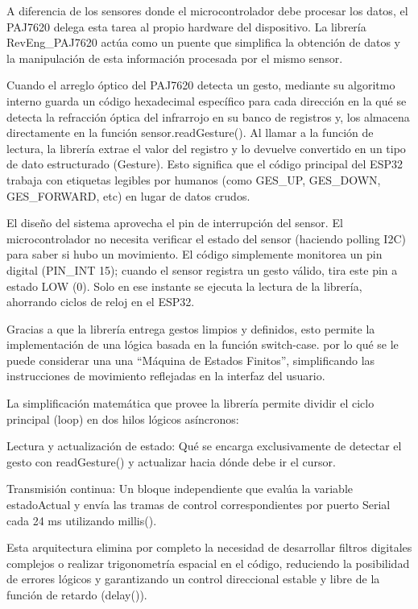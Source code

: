 \documentclass[conference]{IEEEtran}
\begin{document}
A diferencia de los sensores donde el microcontrolador debe procesar los datos, el PAJ7620 delega esta tarea al propio hardware del dispositivo. La librería RevEng\_PAJ7620 actúa como un puente que simplifica la obtención de datos y la manipulación de esta información procesada por el mismo sensor.

Cuando el arreglo óptico del PAJ7620 detecta un gesto, mediante su algoritmo interno guarda un código hexadecimal específico para cada dirección en la qué se detecta la refracción óptica del infrarrojo en su banco de registros y, los almacena directamente en la función sensor.readGesture(). Al llamar a la función de lectura, la librería extrae el valor del registro y lo devuelve convertido en un tipo de dato estructurado (Gesture). Esto significa que el código principal del ESP32 trabaja con etiquetas legibles por humanos (como GES\_UP, GES\_DOWN, GES\_FORWARD, etc) en lugar de datos crudos. 

El diseño del sistema aprovecha el pin de interrupción del sensor. El microcontrolador no necesita verificar el estado del sensor (haciendo polling I2C) para saber si hubo un movimiento. El código simplemente monitorea un pin digital (PIN\_INT 15); cuando el sensor registra un gesto válido, tira este pin a estado LOW (0). Solo en ese instante se ejecuta la lectura de la librería, ahorrando ciclos de reloj en el ESP32.

Gracias a que la librería entrega gestos limpios y definidos, esto permite la implementación de una lógica basada en la función switch-case. por lo qué se le puede considerar una una “Máquina de Estados Finitos”, simplificando las instrucciones de movimiento reflejadas en la interfaz del usuario. 

La simplificación matemática que provee la librería permite dividir el ciclo principal (loop) en dos hilos lógicos asíncronos:

Lectura y actualización de estado: Qué se encarga exclusivamente de detectar el gesto con readGesture() y actualizar hacia dónde debe ir el cursor.

Transmisión continua: Un bloque independiente que evalúa la variable estadoActual y envía las tramas de control correspondientes por puerto Serial cada 24 ms utilizando millis().

Esta arquitectura elimina por completo la necesidad de desarrollar filtros digitales complejos o realizar trigonometría espacial en el código, reduciendo la posibilidad de errores lógicos y garantizando un control direccional estable y libre de la función de retardo (delay()).
\end{document}
